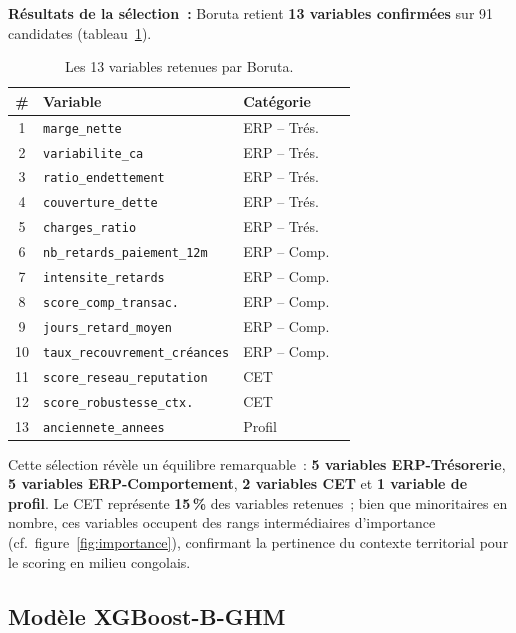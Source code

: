 \documentclass[12pt, a4paper, twocolumn]{article}
\begin{document}
\textbf{Résultats de la sélection~:} Boruta retient \textbf{13 variables confirmées} sur 91 candidates (tableau~\ref{tab:boruta}).

\begin{table}[htbp]
\centering
\caption{Les 13 variables retenues par Boruta.}
\label{tab:boruta}
\small
\begin{tabularx}{\columnwidth}{@{}clXl@{}}
\toprule
\textbf{\#} & \textbf{Variable} & \textbf{Catégorie} \\
\midrule
1 & \texttt{marge\_nette} & ERP -- Trés. \\
2 & \texttt{variabilite\_ca} & ERP -- Trés. \\
3 & \texttt{ratio\_endettement} & ERP -- Trés. \\
4 & \texttt{couverture\_dette} & ERP -- Trés. \\
5 & \texttt{charges\_ratio} & ERP -- Trés. \\
6 & \texttt{nb\_retards\_paiement\_12m} & ERP -- Comp. \\
7 & \texttt{intensite\_retards} & ERP -- Comp. \\
8 & \texttt{score\_comp\_transac.} & ERP -- Comp. \\
9 & \texttt{jours\_retard\_moyen} & ERP -- Comp. \\
10 & \texttt{taux\_recouvrement\_créances} & ERP -- Comp. \\
11 & \texttt{score\_reseau\_reputation} & CET \\
12 & \texttt{score\_robustesse\_ctx.} & CET \\
13 & \texttt{anciennete\_annees} & Profil \\
\bottomrule
\end{tabularx}
\end{table}

Cette sélection révèle un équilibre remarquable~: \textbf{5 variables ERP-Trésorerie}, \textbf{5 variables ERP-Comportement}, \textbf{2 variables CET} et \textbf{1 variable de profil}. Le CET représente \textbf{15\,\%} des variables retenues~; bien que minoritaires en nombre, ces variables occupent des rangs intermédiaires d'importance (cf.\ figure~\ref{fig:importance}), confirmant la pertinence du contexte territorial pour le scoring en milieu congolais.

\subsection{Modèle XGBoost-B-GHM}
\label{subsec:xgboost}
\end{document}
